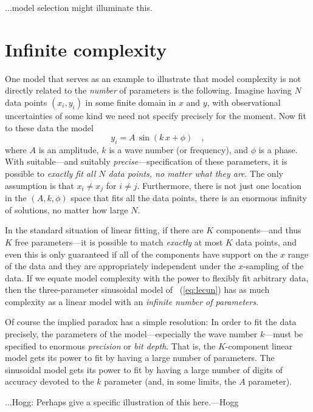 \documentclass[12pt,twoside]{article}
\begin{document}
...model selection might illuminate this.

\section{Infinite complexity}

One model that serves as an example to illustrate that model
complexity is not directly related to the \emph{number} of parameters
is the following.  Imagine having $N$ data points $(x_i,y_i)$ in some finite
domain in $x$ and $y$, with observational uncertainties of some kind
we need not specify precisely for the moment.  Now fit to these data
the model
\begin{equation}\label{eq:lecun}
y_i = A\,\sin (k\,x + \phi)
  \quad ,
\end{equation}
where $A$ is an amplitude, $k$ is a wave number (or frequency), and
$\phi$ is a phase.  With suitable---and suitably
\emph{precise}---specification of these parameters, it is possible to
\emph{exactly fit all $N$ data points, no matter what they are}.  The
only assumption is that $x_i \ne x_j$ for $i \ne j$.  Furthermore,
there is not just one location in the $(A,k,\phi)$ space that fits all
the data points, there is an enormous infinity of solutions, no matter
how large $N$.

In the standard situation of linear fitting, if there are $K$
components---and thus $K$ free parameters---it is possible to match
\emph{exactly} at most $K$ data points, and even this is only
guaranteed if all of the components have support on the $x$ range of
the data and they are appropriately independent under the $x$-sampling
of the data.  If we equate model complexity with the power to flexibly
fit arbitrary data, then the three-parameter sinusoidal model of
\equationname~(\ref{eq:lecun}) has as much complexity as a linear
model with an \emph{infinite number of parameters}.

Of course the implied paradox has a simple resolution: In order to fit
the data precisely, the parameters of the model---especially the wave
number $k$---must be specified to enormous \emph{precision} or \emph{bit depth}.  That is,
the $K$-component linear model gets its power to fit by having a large
number of parameters.  The sinusoidal model gets its power to fit by
having a large number of digits of accuracy devoted to the $k$
parameter (and, in some limits, the $A$ parameter).

...Hogg:  Perhaps give a specific illustration of this here.---Hogg
\end{document}
